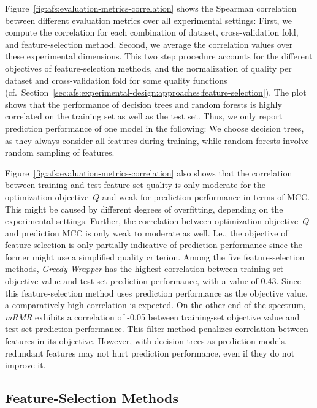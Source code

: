 \documentclass{article}
\theoremstyle{definition}
\begin{document}
Figure~\ref{fig:afs:evaluation-metrics-correlation} shows the Spearman correlation between different evaluation metrics over all experimental settings:
First, we compute the correlation for each combination of dataset, cross-validation fold, and feature-selection method.
Second, we average the correlation values over these experimental dimensions.
This two step procedure accounts for the different objectives of feature-selection methods, and the normalization of quality per dataset and cross-validation fold for some quality functions (cf.~Section~\ref{sec:afs:experimental-design:approaches:feature-selection}).
The plot shows that the performance of decision trees and random forests is highly correlated on the training set as well as the test set.
Thus, we only report prediction performance of one model in the following:
We choose decision trees, as they always consider all features during training, while random forests involve random sampling of features.

Figure~\ref{fig:afs:evaluation-metrics-correlation} also shows that the correlation between training and test feature-set quality is only moderate for the optimization objective~$Q$ and weak for prediction performance in terms of MCC.
This might be caused by different degrees of overfitting, depending on the experimental settings.
Further, the correlation between optimization objective~$Q$ and prediction MCC is only weak to moderate as well.
I.e., the objective of feature selection is only partially indicative of prediction performance since the former might use a simplified quality criterion.
Among the five feature-selection methods, \emph{Greedy Wrapper} has the highest correlation between training-set objective value and test-set prediction performance, with a value of 0.43.
Since this feature-selection method uses prediction performance as the objective value, a comparatively high correlation is expected.
On the other end of the spectrum, \emph{mRMR} exhibits a correlation of -0.05 between training-set objective value and test-set prediction performance.
This filter method penalizes correlation between features in its objective.
However, with decision trees as prediction models, redundant features may not hurt prediction performance, even if they do not improve it.

\subsection{Feature-Selection Methods}
\label{sec:afs:evaluation:feature-selection}
\end{document}

